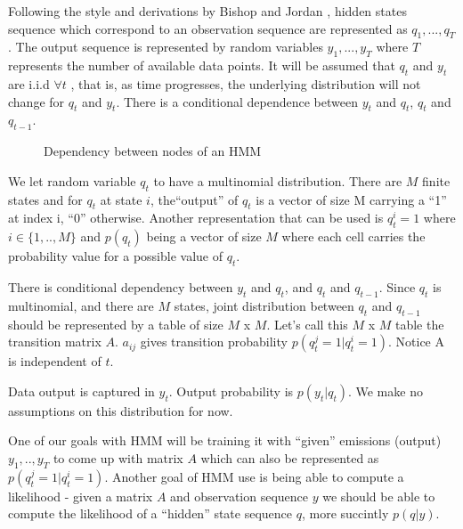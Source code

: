 Following the style and derivations by Bishop and Jordan \cite{jordan}, hidden
states sequence which correspond to an observation sequence are represented as
$q_1,...,q_T$. The output sequence is represented by random variables
$y_1,...,y_T$ where $T$ represents the number of available data points. It will
be assumed that $q_t$ and $y_t$ are i.i.d $\forall t$ , that is, as time
progresses, the underlying distribution will not change for $q_t$ and
$y_t$. There is a conditional dependence between $y_t$ and $q_t$, $q_t$ and
$q_{t-1}$. 

\begin{figure}[!hbp]
\caption{Dependency between nodes of an HMM}
\vspace{0.6cm}
\end{figure}

We let random variable $q_t$ to have a multinomial distribution. There are $M$
finite states and for $q_t$ at state $i$, the``output'' of $q_t$ is a vector of
size M carrying a ``1'' at index i, ``0'' otherwise. Another representation that
can be used is $q_t^i = 1$ where $i \in \{1,..,M\}$ and $p(q_t)$ being a vector
of size $M$ where each cell carries the probability value for a possible value
of $q_t$.

There is conditional dependency between $y_t$ and $q_t$, and $q_t$ and
$q_{t-1}$. Since $q_t$ is multinomial, and there are $M$ states, joint
distribution between $q_t$ and $q_{t-1}$ should be represented by a table of
size $M$ x $M$. Let's call this $M$ x $M$ table the transition matrix
$A$. $a_{ij}$ gives transition probability $p(q_t^j=1 | q_t^i=1)$. Notice A is
independent of $t$.

Data output is captured in $y_t$. Output probability is $p(y_t|q_t)$. We make no
assumptions on this distribution for now. 

One of our goals with HMM will be training it with ``given'' emissions (output)
$y_1,..,y_T$ to come up with matrix $A$ which can also be represented as
$p(q_t^j=1 | q_t^i=1)$. Another goal of HMM use is being able to compute a
likelihood - given a matrix $A$ and observation sequence $y$ we should be able
to compute the likelihood of a ``hidden'' state sequence $q$, more succintly
$p(q|y)$.

